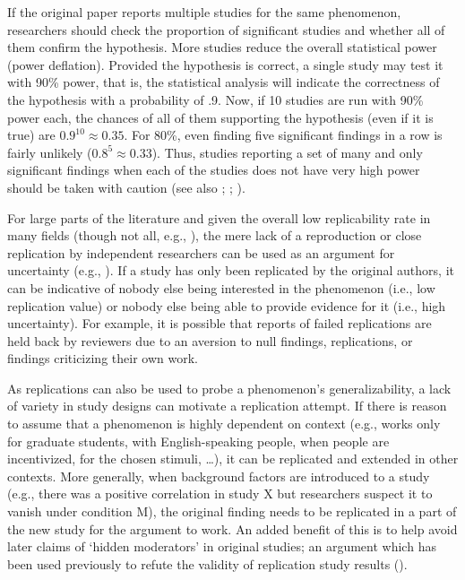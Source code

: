 \documentclass[
  letterpaper,
  DIV=11,
  openany,
  fontsize=12pt,
  parskip=half,
  headings=big,
  numbers=noenddot,
  titlepage=false]{scrreprt}
\begin{document}
If the original paper reports multiple studies for the same phenomenon,
researchers should check the proportion of significant studies and
whether all of them confirm the hypothesis. More studies reduce the
overall statistical power (power deflation). Provided the hypothesis is
correct, a single study may test it with 90\% power, that is, the
statistical analysis will indicate the correctness of the hypothesis
with a probability of .9. Now, if 10 studies are run with 90\% power
each, the chances of all of them supporting the hypothesis (even if it
is true) are \(0.9^{10} \approx 0.35\). For 80\%, even finding five
significant findings in a row is fairly unlikely
(\(0.8^{5} \approx 0.33\)). Thus, studies reporting a set of many and
only significant findings when each of the studies does not have very
high power should be taken with caution (see also
;
;
).

For large parts of the literature and given the overall low
replicability rate in many fields (though not all, e.g.,
), the mere lack of a reproduction or
close replication by independent researchers can be used as an argument
for uncertainty (e.g., ). If a study has only been replicated by the original authors, it
can be indicative of nobody else being interested in the phenomenon
(i.e., low replication value) or nobody else being able to provide
evidence for it (i.e., high uncertainty). For example, it is possible
that reports of failed replications are held back by reviewers due to an
aversion to null findings, replications, or findings criticizing their
own work.

As replications can also be used to probe a phenomenon's
generalizability, a lack of variety in study designs can motivate a
replication attempt. If there is reason to assume that a phenomenon is
highly dependent on context (e.g., works only for graduate students,
with English-speaking people, when people are incentivized, for the
chosen stimuli, \ldots), it can be replicated and extended in other
contexts. More generally, when background factors are introduced to a
study (e.g., there was a positive correlation in study X but researchers
suspect it to vanish under condition M), the original finding needs to
be replicated in a part of the new study for the argument to work. An
added benefit of this is to help avoid later claims of `hidden
moderators' in original studies; an argument which has been used
previously to refute the validity of replication study results
().
\end{document}
